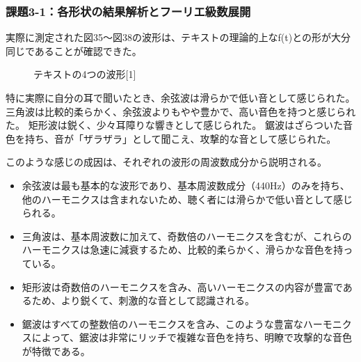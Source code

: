 \documentclass{article}
\begin{document}
\subsubsection{課題3-1：各形状の結果解析とフーリエ級数展開}
\begin{spacing}{1.2}
    実際に測定された図35〜図38の波形は、テキストの理論的上なf(t)との形が大分同じであることが確認できた。
    \begin{figure}[ht] %
        \centering
        \caption{テキストの4つの波形[1]}
    \end{figure}
    \FloatBarrier
    特に実際に自分の耳で聞いたとき、余弦波は滑らかで低い音として感じられた。
    三角波は比較的柔らかく、余弦波よりもやや豊かで、高い音色を持つと感じられた。
    矩形波は鋭く、少々耳障りな響きとして感じられた。
    鋸波はざらついた音色を持ち、音が「ザラザラ」として聞こえ、攻撃的な音として感じられた。

    このような感じの成因は、それぞれの波形の周波数成分から説明される。
    \begin{itemize}
        \item 余弦波は最も基本的な波形であり、基本周波数成分（440Hz）のみを持ち、他のハーモニクスは含まれないため、聴く者には滑らかで低い音として感じられる。
        \item 三角波は、基本周波数に加えて、奇数倍のハーモニクスを含むが、これらのハーモニクスは急速に減衰するため、比較的柔らかく、滑らかな音色を持っている。
        \item 矩形波は奇数倍のハーモニクスを含み、高いハーモニクスの内容が豊富であるため、より鋭くて、刺激的な音として認識される。
        \item 鋸波はすべての整数倍のハーモニクスを含み、このような豊富なハーモニクスによって、鋸波は非常にリッチで複雑な音色を持ち、明瞭で攻撃的な音色が特徴である。
    \end{itemize}    


\end{spacing}
\end{document}
